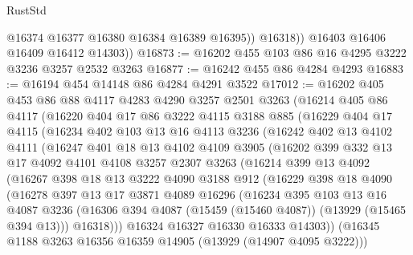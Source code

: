 \begin{lexlean}{RustStd}
\begin{coremodule}
                @16374
                @16377
                @16380
                @16384
                @16389
                @16395))
            @16318))
        @16403
        @16406
        @16409
        @16412
        @14303))
@16873 := @16202 @455 @103 @86 @16 @4295 @3222 @3236 @3257 @2532 @3263
@16877 := @16242 @455 @86 @4284 @4293
@16883 := @16194 @454 @14148 @86 @4284 @4291 @3522
@17012 := @16202
    @405
    @453
    @86
    @88
    @4117
    @4283
    @4290
    @3257
    @2501
    @3263
    (@16214
      @405
      @86
      @4117
      (@16220
        @404
        @17
        @86
        @3222
        @4115
        @3188
        @885
        (@16229
          @404
          @17
          @4115
          (@16234
            @402
            @103
            @13
            @16
            @4113
            @3236
            (@16242
              @402
              @13
              @4102
              @4111
              (@16247
                @401
                @18
                @13
                @4102
                @4109
                @3905
                (@16202
                  @399
                  @332
                  @13
                  @17
                  @4092
                  @4101
                  @4108
                  @3257
                  @2307
                  @3263
                  (@16214
                    @399
                    @13
                    @4092
                    (@16267
                      @398
                      @18
                      @13
                      @3222
                      @4090
                      @3188
                      @912
                      (@16229
                        @398
                        @18
                        @4090
                        (@16278
                          @397
                          @13
                          @17
                          @3871
                          @4089
                          @16296
                          (@16234
                            @395
                            @103
                            @13
                            @16
                            @4087
                            @3236
                            (@16306 @394 @4087 (@15459 (@15460 @4087)) (@13929 (@15465 @394 @13)))
                            @16318)))
                      @16324
                      @16327
                      @16330
                      @16333
                      @14303))
                  (@16345 @1188 @3263 @16356 @16359 @14905 (@13929 (@14907 @4095 @3222)))

\end{coremodule}
\end{lexlean}
